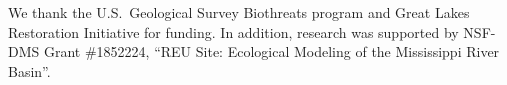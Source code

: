 \documentclass[preprint,review,12pt,authoryear]{elsarticle}
\def\ds{\displaystyle}
\begin{document}
We thank the U.S.~Geological Survey  Biothreats program and Great
Lakes Restoration Initiative for funding.
In addition, research was supported by NSF-DMS Grant \#1852224, ``REU Site: Ecological Modeling of the Mississippi River Basin''. 




%
%
%
%
%
%
%
%


\end{document}
